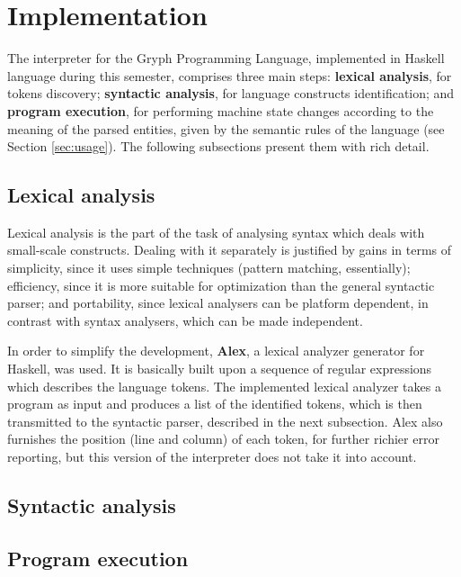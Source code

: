 \section{Implementation}
\label{sec:implement}

The interpreter for the Gryph Programming Language,
implemented in Haskell language during this semester, comprises three
main steps: \textbf{lexical analysis}, for tokens discovery;
\textbf{syntactic analysis}, for language constructs
identification; and \textbf{program execution}, for
performing machine state changes according to the
meaning of the parsed entities, given by the semantic
rules of the language (see Section \ref{sec:usage}). The following subsections
present them with rich detail.

\subsection{Lexical analysis}

Lexical analysis is the part of the task of analysing syntax
which deals with small-scale constructs. Dealing with it
separately is justified by gains in terms of simplicity, since
it uses simple techniques (pattern matching, essentially); efficiency, since it is
more suitable for optimization than the general syntactic parser; 
and portability, since lexical analysers can be platform dependent, in contrast
with syntax analysers, which can be made independent.

In order to simplify the development, \textbf{Alex}, a lexical
analyzer generator for Haskell, was used. It is basically built
upon a sequence of regular expressions which describes the 
language tokens. The implemented lexical analyzer takes a program as input and produces
a list of the identified tokens, which is then transmitted to the
syntactic parser, described in the next subsection. Alex also furnishes
the position (line and column) of each token, for further richier error reporting, but
this version of the interpreter does not take it into account.

\subsection{Syntactic analysis}


\subsection{Program execution}
